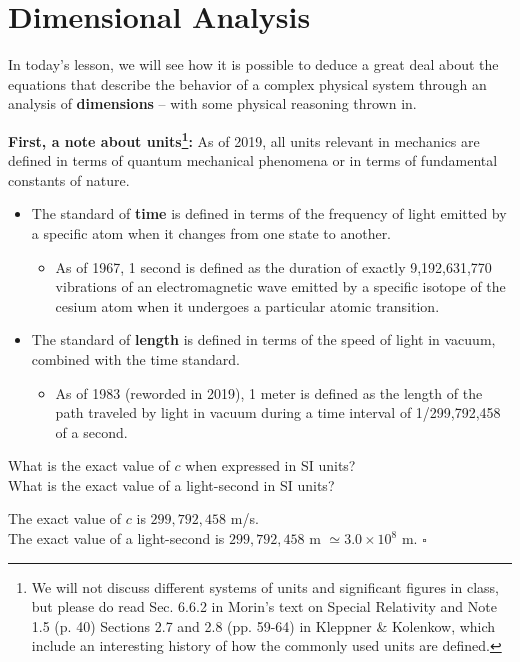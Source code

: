 \documentclass[11pt, letterpaper, openany]{book}
\newenvironment{exercise}[1][Exercise]{%
  \tcolorbox[blanker, breakable, left=1em,
    before skip=1em, after skip=1em,
    borderline west={3pt}{0pt}{PhysNavy},
    colback=PhysCream,
    before upper={\textcolor{PhysNavy}{\sffamily\bfseries #1:}\space}
  ]%
}{%
  \endtcolorbox%
}
\newenvironment{solution}[1][Solution]{%
  \tcolorbox[blanker, breakable, left=1em,
    before skip=1em, after skip=1em,
    borderline west={2pt}{0pt}{PhysTeal},
    colback=PhysCream,
    before upper={\textcolor{PhysTeal}{\sffamily\bfseries #1.}\space}
  ]%
}{%
  \hfill\textcolor{PhysTeal}{\ensuremath{\square}}\endtcolorbox%
}
\begin{document}
\chapter{Dimensional Analysis}

In today's lesson, we will see how it is possible to deduce a great deal about the equations that describe the behavior of a complex physical system through an analysis of \textbf{dimensions} -- with some physical reasoning thrown in.

\textbf{First, a note about units\footnote{We will not discuss different systems of units and significant figures in class, but please do read Sec. 6.6.2 in Morin's text on Special Relativity and Note 1.5 (p. 40) Sections 2.7 and 2.8 (pp. 59-64) in Kleppner \& Kolenkow, which include an interesting history of how the commonly used units are defined.}:} As of 2019, all units relevant in mechanics are defined in terms of quantum mechanical phenomena or in terms of fundamental constants of nature.
\begin{itemize}
    \item The standard of \textbf{time} is defined in terms of the frequency of light emitted by a specific atom when it changes from one state to another.
    \begin{itemize}
        \item As of 1967, 1 second is defined as the duration of exactly 9,192,631,770 vibrations of an electromagnetic wave emitted by a specific isotope of the cesium atom when it undergoes a particular atomic transition.
    \end{itemize}
    \item The standard of \textbf{length} is defined in terms of the speed of light in vacuum, combined with the time standard.
    \begin{itemize}
        \item As of 1983 (reworded in 2019), 1 meter is defined as the length of the path traveled by light in vacuum during a time interval of 1/299,792,458 of a second.
    \end{itemize}
\end{itemize}

\begin{exercise}[Quick Exercise 1]
What is the exact value of $c$ when expressed in SI units? \\
What is the exact value of a light-second in SI units?
\end{exercise}
\begin{solution}
The exact value of $c$ is $299,792,458$ m/s. \\
The exact value of a light-second is $299,792,458$ m $\simeq 3.0 \times 10^8$ m.
\end{solution}
\end{document}
